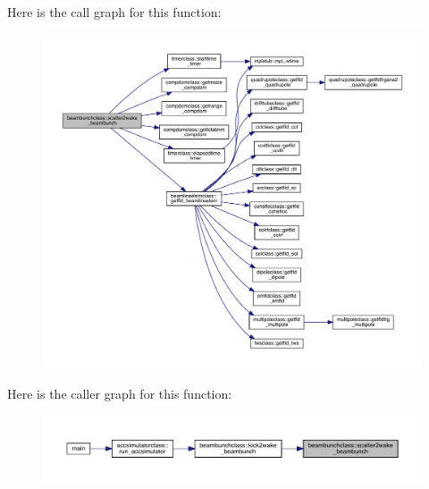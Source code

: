 Here is the call graph for this function\+:\nopagebreak
\begin{figure}[H]
\begin{center}
\leavevmode
\includegraphics[width=350pt]{namespacebeambunchclass_aa17d706a08d23a054bf547514e796e6a_cgraph}
\end{center}
\end{figure}
Here is the caller graph for this function\+:\nopagebreak
\begin{figure}[H]
\begin{center}
\leavevmode
\includegraphics[width=350pt]{namespacebeambunchclass_aa17d706a08d23a054bf547514e796e6a_icgraph}
\end{center}
\end{figure}
\mbox{\label{namespacebeambunchclass_a80dd0ce0010992cda1f2ba4d873371e0}} 
